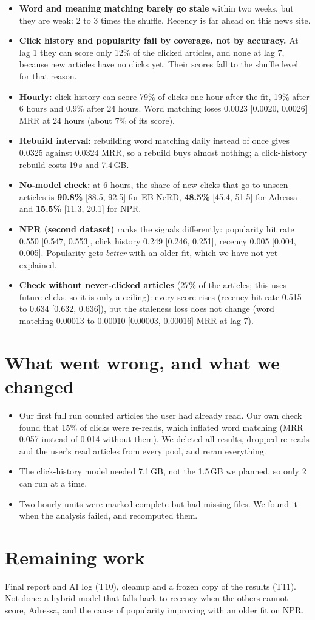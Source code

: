 \documentclass[10pt,a4paper]{article}
\begin{document}
\begin{itemize}
\item \textbf{Word and meaning matching barely go stale} within two weeks, but they are weak: 2 to 3 times the shuffle. Recency is far ahead on this news site.
\item \textbf{Click history and popularity fail by coverage, not by accuracy.} At lag 1 they can score only 12\% of the clicked articles, and none at lag 7, because new articles have no clicks yet. Their scores fall to the shuffle level for that reason.
\item \textbf{Hourly:} click history can score 79\% of clicks one hour after the fit, 19\% after 6 hours and 0.9\% after 24 hours. Word matching loses 0.0023 [0.0020, 0.0026] MRR at 24 hours (about 7\% of its score).
\item \textbf{Rebuild interval:} rebuilding word matching daily instead of once gives 0.0325 against 0.0324 MRR, so a rebuild buys almost nothing; a click-history rebuild costs 19\,s and 7.4\,GB.
\item \textbf{No-model check:} at 6 hours, the share of new clicks that go to unseen articles is \textbf{90.8\%} [88.5, 92.5] for EB-NeRD, \textbf{48.5\%} [45.4, 51.5] for Adressa and \textbf{15.5\%} [11.3, 20.1] for NPR.
\item \textbf{NPR (second dataset)} ranks the signals differently: popularity hit rate 0.550 [0.547, 0.553], click history 0.249 [0.246, 0.251], recency 0.005 [0.004, 0.005]. Popularity gets \emph{better} with an older fit, which we have not yet explained.
\item \textbf{Check without never-clicked articles} (27\% of the articles; this uses future clicks, so it is only a ceiling): every score rises (recency hit rate 0.515 to 0.634 [0.632, 0.636]), but the staleness loss does not change (word matching 0.00013 to 0.00010 [0.00003, 0.00016] MRR at lag 7).
\end{itemize}

\section{What went wrong, and what we changed}
\begin{itemize}
\item Our first full run counted articles the user had already read. Our own check found that 15\% of clicks were re-reads, which inflated word matching (MRR 0.057 instead of 0.014 without them). We deleted all results, dropped re-reads and the user's read articles from every pool, and reran everything.
\item The click-history model needed 7.1\,GB, not the 1.5\,GB we planned, so only 2 can run at a time.
\item Two hourly units were marked complete but had missing files. We found it when the analysis failed, and recomputed them.
\end{itemize}

\section{Remaining work}
Final report and AI log (T10), cleanup and a frozen copy of the results (T11). Not done: a hybrid model that falls back to recency when the others cannot score, Adressa, and the cause of popularity improving with an older fit on NPR.
\end{document}
